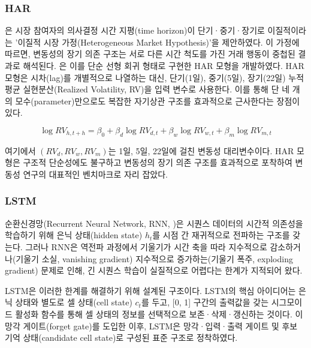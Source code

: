 \documentclass{article}
\begin{document}
\subsubsection{HAR}
\label{subsubsec:har_review}

\citet{muller1997}은 시장 참여자의 의사결정 시간 지평(time horizon)이 단기·중기·장기로 이질적이라는 '이질적 시장 가정(Heterogeneous Market Hypothesis)'을 제안하였다. 이 가정에 따르면, 변동성의 장기 의존 구조는 서로 다른 시간 척도를 가진 거래 행동이 중첩된 결과로 해석된다. 
\citet{corsi2009}은 이를 단순 선형 회귀 형태로 구현한 HAR 모형을 개발하였다. HAR 모형은 시차(lag)를 개별적으로 나열하는 대신, 단기(1일), 중기(5일), 장기(22일) 누적 평균 실현분산(Realized Volatility, RV)을 입력 변수로 사용한다. 이를 통해 단 네 개의 모수(parameter)만으로도 복잡한 자기상관 구조를 효과적으로 근사한다는 장점이 있다.

\begin{equation}
\log RV_{h,t+h} = \beta_0 + \beta_d \log RV_{d,t} + \beta_w \log RV_{w,t} + \beta_m \log RV_{m,t} \label{eq:har_full}
\end{equation}

여기에서 $(RV_d, RV_w, RV_m)$는 1일, 5일, 22일에 걸친 변동성 대리변수이다. HAR 모형은 구조적 단순성에도 불구하고 변동성의 장기 의존 구조를 효과적으로 포착하여 변동성 연구의 대표적인 벤치마크로 자리 잡았다.

\subsubsection{LSTM}
\label{subsubsec:lstm_review}

순환신경망(Recurrent Neural Network, RNN, \citealp{rumelhart1986learning})은 시퀀스 데이터의 시간적 의존성을 학습하기 위해 은닉 상태(hidden state) $h_t$를 시점 간 재귀적으로 전파하는 구조를 갖는다. 그러나 RNN은 역전파 과정에서 기울기가 시간 축을 따라 지수적으로 감소하거나(기울기 소실, vanishing gradient) 지수적으로 증가하는(기울기 폭주, exploding gradient) 문제로 인해, 긴 시퀀스 학습이 실질적으로 어렵다는 한계가 지적되어 왔다.

LSTM\citep{hochreiter1997}은 이러한 한계를 해결하기 위해 설계된 구조이다. LSTM의 핵심 아이디어는 은닉 상태와 별도로 셀 상태(cell state) $c_t$를 두고, [0, 1] 구간의 출력값을 갖는 시그모이드 활성화 함수를 통해 셀 상태의 정보를 선택적으로 보존·삭제·갱신하는 것이다. \citet{gers2000}이 망각 게이트(forget gate)를 도입한 이후, LSTM은 망각·입력·출력 게이트 및 후보 기억 상태(candidate cell state)로 구성된 표준 구조로 정착하였다.
\end{document}
